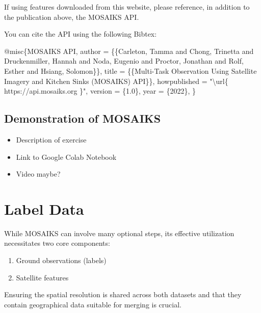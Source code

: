 \documentclass[
  letterpaper,
  DIV=11,
  numbers=noendperiod]{scrreprt}
\newenvironment{Shaded}{\begin{snugshade}}{\end{snugshade}}
\newcommand{\CharTok}[1]{\textcolor[rgb]{0.13,0.47,0.30}{#1}}
\newcommand{\CommentTok}[1]{\textcolor[rgb]{0.37,0.37,0.37}{#1}}
\newcommand{\DataTypeTok}[1]{\textcolor[rgb]{0.68,0.00,0.00}{#1}}
\newcommand{\NormalTok}[1]{\textcolor[rgb]{0.00,0.23,0.31}{#1}}
\newcommand{\OtherTok}[1]{\textcolor[rgb]{0.00,0.23,0.31}{#1}}
\newcommand{\StringTok}[1]{\textcolor[rgb]{0.13,0.47,0.30}{#1}}
\newcommand{\VariableTok}[1]{\textcolor[rgb]{0.07,0.07,0.07}{#1}}
\providecommand{\tightlist}{%
  \setlength{\itemsep}{0pt}\setlength{\parskip}{0pt}}\usepackage{longtable,booktabs,array}
\begin{document}
If using features downloaded from this website, please reference, in
addition to the publication above, the MOSAIKS API.

You can cite the API using the following Bibtex:

\begin{Shaded}
\begin{Highlighting}[]
\CommentTok{ }\VariableTok{@misc}\NormalTok{\{}\OtherTok{MOSAIKS} \OtherTok{API}\NormalTok{,}
    \DataTypeTok{author}\NormalTok{ = \{\{Carleton, Tamma and Chong, Trinetta and Druckenmiller, Hannah and Noda, Eugenio and Proctor, Jonathan and Rolf, Esther and Hsiang, Solomon\}\},}
    \DataTypeTok{title}\NormalTok{ = \{\{Multi{-}Task Observation Using Satellite Imagery and Kitchen Sinks (MOSAIKS) API\}\},}
    \DataTypeTok{howpublished}\NormalTok{ = "}\CharTok{\textbackslash{}url}\StringTok{\{ https://api.mosaiks.org \}}\NormalTok{",}
    \DataTypeTok{version}\NormalTok{ = \{1.0\},}
    \DataTypeTok{year}\NormalTok{ = \{2022\},}
\NormalTok{\}}
\end{Highlighting}
\end{Shaded}

\hypertarget{demonstration-of-mosaiks}{%
\chapter{Demonstration of MOSAIKS}\label{demonstration-of-mosaiks}}

\begin{itemize}
\tightlist
\item
  Description of exercise
\item
  Link to Google Colab Notebook
\item
  Video maybe?
\end{itemize}

\part{Label Data}

While MOSAIKS can involve many optional steps, its effective utilization
necessitates two core components:

\begin{enumerate}
\def\labelenumi{\arabic{enumi}.}
\tightlist
\item
  Ground observations (labels)
\item
  Satellite features
\end{enumerate}

Ensuring the spatial resolution is shared across both datasets and that
they contain geographical data suitable for merging is crucial.
\end{document}
